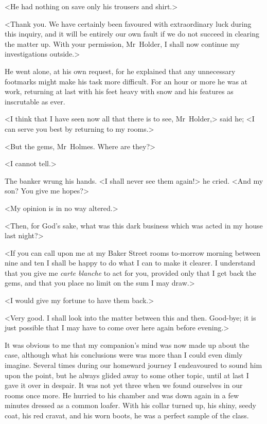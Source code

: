 <He had nothing on save only his trousers and shirt.>

<Thank you. We have certainly been favoured with extraordinary luck during this inquiry, and it will be entirely our own fault if we do not succeed in clearing the matter up. With your permission, Mr~Holder, I shall now continue my investigations outside.>

He went alone, at his own request, for he explained that any unnecessary footmarks might make his task more difficult. For an hour or more he was at work, returning at last with his feet heavy with snow and his features as inscrutable as ever.

<I think that I have seen now all that there is to see, Mr~Holder,> said he; <I can serve you best by returning to my rooms.>

<But the gems, Mr~Holmes. Where are they?>

<I cannot tell.>

The banker wrung his hands. <I shall never see them again!> he cried. <And my son? You give me hopes?>

<My opinion is in no way altered.>

<Then, for God's sake, what was this dark business which was acted in my house last night?>

<If you can call upon me at my Baker Street rooms to-morrow morning between nine and ten I shall be happy to do what I can to make it clearer. I understand that you give me \textit{carte blanche} to act for you, provided only that I get back the gems, and that you place no limit on the sum I may draw.>

<I would give my fortune to have them back.>

<Very good. I shall look into the matter between this and then. Good-bye; it is just possible that I may have to come over here again before evening.>

It was obvious to me that my companion's mind was now made up about the case, although what his conclusions were was more than I could even dimly imagine. Several times during our homeward journey I endeavoured to sound him upon the point, but he always glided away to some other topic, until at last I gave it over in despair. It was not yet three when we found ourselves in our rooms once more. He hurried to his chamber and was down again in a few minutes dressed as a common loafer. With his collar turned up, his shiny, seedy coat, his red cravat, and his worn boots, he was a perfect sample of the class.

